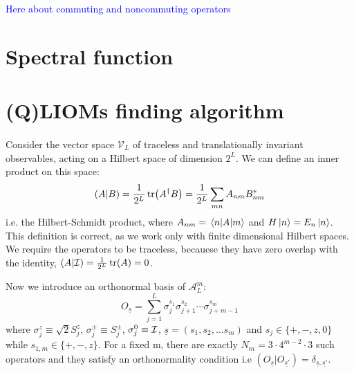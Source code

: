 \textcolor{blue}{ Here about commuting and noncommuting operators}

\section{Spectral function \label{sec:spectral function}}

\section{(Q)LIOMs finding algorithm \label{sec:algorithm}}
  \paragraph{}Consider the vector space \(\mathcal{V}_L\) of traceless and translationally invariant observables, acting on a Hilbert space of dimension \(2^L\). We can define an inner
  product on this space:
  \begin{equation}
      \left(A|B\right) = \frac{1}{2^L}\tr(A^{\dagger}B) = \frac{1}{2^L} \sum_{mn} A_{nm}B_{nm}^{\ast}
  \end{equation}
  i.e. the Hilbert-Schmidt product, where \(A_{nm} = \matrixel{n}{A}{m}\) and \(H\ket{n} = E_n \ket{n}\). This definition is correct, as we work only with finite dimensional Hilbert spaces. We require the operators to be traceless, becauese they
  have zero overlap with the identity, \(\left(A|\mathcal{I}\right)=\frac{1}{2^L}\tr(A) = 0\).
  
  
  
  Now we introduce an orthonormal basis of \({\mathcal{A}_L^m}\):
  \begin{equation}
      O_{\underline{s} } = \sum_{j = 1}^L \sigma_{j}^{s_1}\sigma_{j+1}^{s_2}\cdots \sigma_{j+m-1}^{s_m}
  \end{equation}
  where \(\sigma^z_j \equiv \sqrt{2}S^{z}_j\), \(\sigma^{\pm}_j \equiv S^{\pm}_j\), \(\sigma^0_j\equiv \mathcal{I}\), \(\underline{s} = (s_1,s_2,\ldots s_m)\)
  and \(s_j \in \{+,-,z,0\}\) while \(s_{1,m} \in \{+,-,z\}\). For a fixed m, there are exactly \(N_m = 3\cdot 4^{m-2}\cdot 3\) such operators and they
  satisfy an orthonormality condition i.e \(\left(O_{\underline{s}}|O_{\underline{s'}}\right) = \delta_{\underline{s},\underline{s'}}\). 
  
